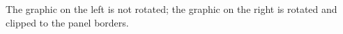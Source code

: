 The graphic on the left is not rotated; the graphic on the right is rotated and clipped to the panel borders.